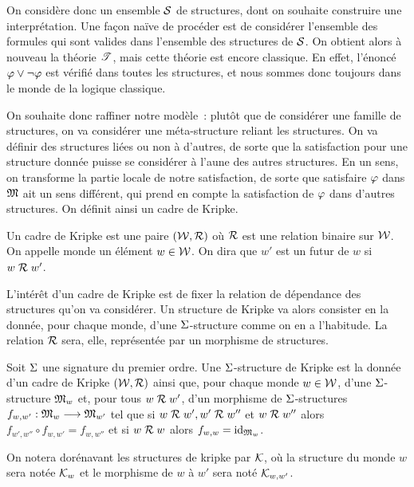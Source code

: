 On considère donc un ensemble $\mathcal{S}$ de structures, dont on souhaite
construire une interprétation. Une façon naïve de procéder est de considérer
l'ensemble des formules qui sont valides dans l'ensemble des structures de
$\mathcal{S}$. On obtient alors à nouveau la théorie $\mathscr T$, mais cette théorie est
encore classique. En effet, l'énoncé $\varphi\lor\lnot\varphi$ est vérifié dans
toutes les structures, et nous sommes donc toujours dans le monde de la logique
classique.

On souhaite donc raffiner notre modèle~: plutôt que de considérer une famille de
structures, on va considérer une méta-structure reliant les structures. On va
définir des structures liées ou non à d'autres, de sorte que la satisfaction
pour une structure donnée puisse se considérer à l'aune des autres structures.
En un sens, on transforme la partie locale de notre satisfaction, de sorte que
\og satisfaire $\varphi$ dans $\mathfrak{M}$ \fg ait un sens différent, qui prend en
compte la satisfaction de $\varphi$ dans d'autres structures. On définit ainsi un
cadre de Kripke.

\begin{definition}
  Un cadre de Kripke est une paire $(\mathcal{W},\mathrel{\mathcal{R}})$ où $\mathrel{\mathcal{R}}$ est une
  relation binaire sur $\mathcal{W}$. On appelle monde un élément $w \in \mathcal{W}$.
  On dira que $w'$ est un futur de $w$ si $w\mathrel{\mathcal{R}} w'$.
\end{definition}

L'intérêt d'un cadre de Kripke est de fixer la relation de dépendance des
structures qu'on va considérer. Un structure de Kripke va alors consister en la
donnée, pour chaque monde, d'une $\Sigma$-structure comme on en a l'habitude.
La relation $\mathrel{\mathcal{R}}$ sera, elle, représentée par un morphisme de structures.

\begin{definition}
  Soit $\Sigma$ une signature du premier ordre.
  Une $\Sigma$-structure de Kripke est la donnée d'un cadre de Kripke
  $(\mathcal{W},\mathrel{\mathcal{R}})$ ainsi que, pour chaque monde $w \in \mathcal{W}$, d'une
  $\Sigma$-structure $\mathfrak{M}_w$ et, pour tous $w\mathrel{\mathcal{R}} w'$, d'un morphisme de
  $\Sigma$-structures
  $f_{w,w'} : \displaystyle \mathfrak{M}_w \longrightarrow \mathfrak{M}_{w'}$ tel que si
  $w\mathrel{\mathcal{R}} w', w'\mathrel{\mathcal{R}} w''$ et $w\mathrel{\mathcal{R}} w''$ alors
  $f_{w',w''}\circ f_{w,w'} = f_{w,w''}$ et si $w\mathrel{\mathcal{R}} w$ alors
  $f_{w,w} = \operatorname{id}_{\mathfrak{M}_w}$.
\end{definition}

\begin{notation}
  On notera dorénavant les structures de kripke par $\mathcal{K}$, où la structure
  du monde $w$ sera notée $\mathcal{K}_w$ et le morphisme de $w$ à $w'$ sera noté
  $\mathcal{K}_{w,w'}$.
\end{notation}


